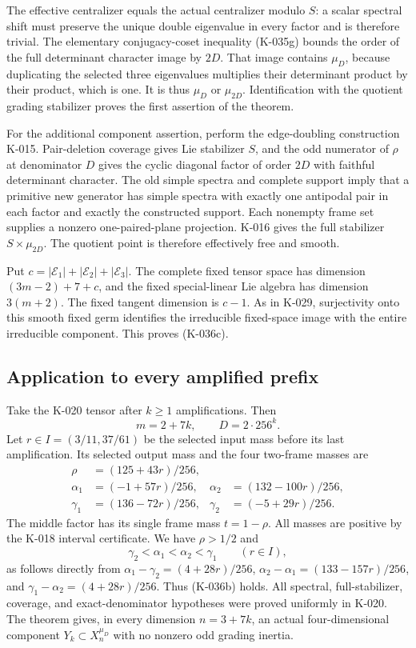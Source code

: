 The effective centralizer equals the actual centralizer modulo
$S$: a scalar spectral shift must preserve the unique double
eigenvalue in every factor and is therefore trivial.  The
elementary conjugacy-coset inequality (K-035g) bounds the
order of the full determinant character image by $2D$.
That image contains $\mu_D$, because duplicating the selected
three eigenvalues multiplies their determinant product by
their product, which is one.  It is thus $\mu_D$ or
$\mu_{2D}$.  Identification with the quotient grading
stabilizer proves the first assertion of the theorem.

For the additional component assertion, perform the
edge-doubling construction K-015.  Pair-deletion coverage
gives Lie stabilizer $S$, and the odd numerator of $\rho$
at denominator $D$ gives the cyclic diagonal factor of
order $2D$ with faithful determinant character.  The
old simple spectra and complete support imply that a
primitive new generator has simple spectra with exactly
one antipodal pair in each factor and exactly the
constructed support.  Each nonempty frame set supplies
a nonzero one-paired-plane projection.  K-016 gives the
full stabilizer $S\times\mu_{2D}$.  The quotient point is
therefore effectively free and smooth.

Put $c=|\mathcal E_1|+|\mathcal E_2|+|\mathcal E_3|$.
The complete fixed tensor space has dimension
$(3m-2)+7+c$, and the fixed special-linear Lie algebra
has dimension $3(m+2)$.  The fixed tangent dimension is
$c-1$.  As in K-029, surjectivity onto this smooth fixed
germ identifies the irreducible fixed-space image with
the entire irreducible component.  This proves (K-036c).

\subsection*{Application to every amplified prefix}

Take the K-020 tensor after $k\ge1$ amplifications.  Then
\[
             m=2+7k,\qquad D=2\cdot256^k.
\]
Let $r\in I=(3/11,37/61)$ be the selected input mass
before its last amplification.  Its selected output
mass and the four two-frame masses are
\[
\begin{aligned}
 \rho&=(125+43r)/256,\\
 \alpha_1&=(-1+57r)/256,&
 \alpha_2&=(132-100r)/256,\\
 \gamma_1&=(136-72r)/256,&
 \gamma_2&=(-5+29r)/256.
\end{aligned}                                             \tag{K-036g}
\]
The middle factor has its single frame mass $t=1-\rho$.
All masses are positive by the K-018 interval certificate.
We have $\rho>1/2$ and
\[
          \gamma_2<\alpha_1<\alpha_2<\gamma_1
                         \qquad(r\in I),                \tag{K-036h}
\]
as follows directly from
$\alpha_1-\gamma_2=(4+28r)/256$,
$\alpha_2-\alpha_1=(133-157r)/256$, and
$\gamma_1-\alpha_2=(4+28r)/256$.
Thus (K-036b) holds.  All spectral, full-stabilizer,
coverage, and exact-denominator hypotheses were proved
uniformly in K-020.  The theorem gives, in every
dimension $n=3+7k$, an actual four-dimensional component
$Y_k\subset X_n^{\mu_D}$ with no nonzero odd grading inertia.

